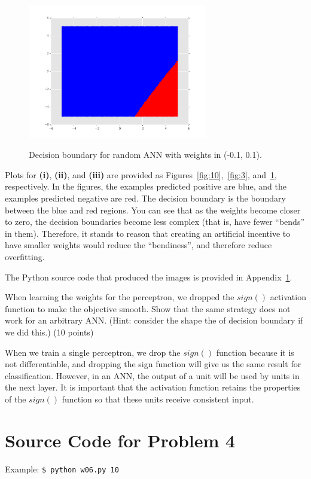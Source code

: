 \documentclass[fleqn]{homework}
\begin{document}
\begin{problem}{4}
    \begin{figure}
      \centering
      \caption{Decision boundary for random ANN with weights in (-0.1, 0.1).}
      \includegraphics[width=0.7\textwidth]{0_1.pdf}
      \label{fig:0.1}
    \end{figure}

    Plots for \textbf{(i)}, \textbf{(ii)}, and \textbf{(iii)} are provided as
    Figures~\ref{fig:10},~\ref{fig:3}, and~\ref{fig:0.1}, respectively.  In the
    figures, the examples predicted positive are blue, and the examples
    predicted negative are red.  The decision boundary is the boundary between
    the blue and red regions.  You can see that as the weights become closer to
    zero, the decision boundaries become less complex (that is, have fewer
    ``bends'' in them).  Therefore, it stands to reason that creating an
    artificial incentive to have smaller weights would reduce the ``bendiness'',
    and therefore reduce overfitting.

    The Python source code that produced the images is provided in
    Appendix~\ref{p4src}.
  \end{problem}

  \begin{problem}{5}
    \begin{question}
      When learning the weights for the perceptron, we dropped the $sign()$
      activation function to make the objective smooth. Show that the same
      strategy does not work for an arbitrary ANN.  (Hint: consider the shape the
      of decision boundary if we did this.) (10 points)
    \end{question}

    When we train a single perceptron, we drop the $sign()$ function because it
    is not differentiable, and dropping the sign function will give us the same
    result for classification.  However, in an ANN, the output of a unit will be
    used by units in the next layer.  It is important that the activation
    function retains the properties of the $sign()$ function so that these units
    receive consistent input.
  \end{problem}

  \newpage
  \appendix
  \section{Source Code for Problem 4}
  \label{p4src}
  

  Example: \texttt{\$ python w06.py 10}
\end{document}
